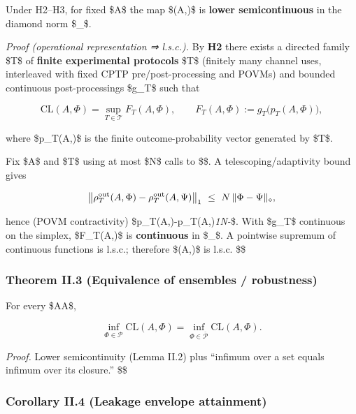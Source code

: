 \documentclass[
]{article}
\numberwithin{equation}{section}
\begin{document}
Under H2--H3, for fixed \$A\$ the map \$\Phi\mapsto{}(A,\Phi)\$
is \textbf{lower semicontinuous} in the diamond norm
\$\textbar{}\cdot\textbar\_\diamond\$.

\emph{Proof (operational representation ⇒ l.s.c.).} By \textbf{H2} there
exists a directed family \$\mathscr T\$ of \textbf{finite experimental
protocols} \$T\$ (finitely many channel uses, interleaved with fixed
CPTP pre/post-processing and POVMs) and bounded continuous
post-processings \$g\_T\$ such that

\[
\mathrm{CL}(A,\Phi)=\sup_{T\in\mathscr T} F_T(A,\Phi),\qquad
F_T(A,\Phi):=g_T\!\big(p_T(A,\Phi)\big),
\]

where \$p\_T(A,\Phi)\$ is the finite outcome-probability vector
generated by \$T\$.

Fix \$A\$ and \$T\$ using at most \$N\$ calls to \$\Phi\$. A
telescoping/adaptivity bound gives

\[
\big\|\rho^{\rm out}_T(A,\Phi)-\rho^{\rm out}_T(A,\Psi)\big\|_1\ \le\ N\,\|\Phi-\Psi\|_\diamond,
\]

hence (POVM contractivity)
\$\textbar p\_T(A,\Phi)-p\_T(A,\Psi)\textbar{}\emph{1\le N\textbar{}\Phi-\Psi\textbar{}}\diamond\$.
With \$g\_T\$ continuous on the simplex, \$F\_T(A,\cdot)\$ is
\textbf{continuous} in \$\textbar{}\cdot\textbar\_\diamond\$. A
pointwise supremum of continuous functions is l.s.c.; therefore
\$\Phi\mapsto{}(A,\Phi)\$ is l.s.c. \$\square\$

\hypertarget{theorem-ii.3-equivalence-of-ensembles-robustness}{%
\subsubsection{Theorem II.3 (Equivalence of ensembles /
robustness)}\label{theorem-ii.3-equivalence-of-ensembles-robustness}}

For every \$A\in\mathcal A\$,

\[
\inf_{\Phi\in \mathcal P}\mathrm{CL}(A,\Phi)=\inf_{\Phi\in \overline{\mathcal P}}\mathrm{CL}(A,\Phi).
\]

\emph{Proof.} Lower semicontinuity (Lemma II.2) plus ``infimum over a
set equals infimum over its closure.'' \$\square\$

\hypertarget{corollary-ii.4-leakage-envelope-attainment}{%
\subsubsection{Corollary II.4 (Leakage envelope
attainment)}\label{corollary-ii.4-leakage-envelope-attainment}}
\end{document}
